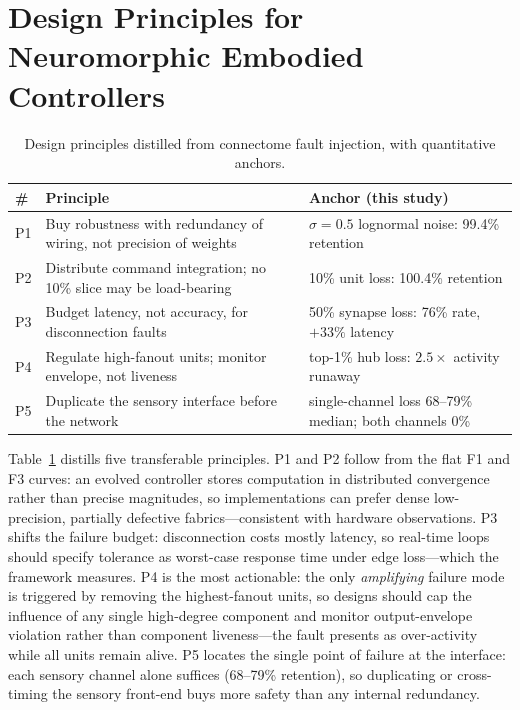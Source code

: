 \section{Design Principles for Neuromorphic Embodied Controllers}
\begin{table}[tb]
\centering
\caption{Design principles distilled from connectome fault injection, with quantitative anchors.}
\label{tab:principles}
\begin{tabular}{@{}p{0.6cm}p{3.4cm}p{3.4cm}@{}}
\toprule
\# & Principle & Anchor (this study) \\
\midrule
P1 & Buy robustness with redundancy of wiring, not precision of weights & $\sigma{=}0.5$ lognormal noise: 99.4\% retention \\
P2 & Distribute command integration; no 10\% slice may be load-bearing & 10\% unit loss: 100.4\% retention \\
P3 & Budget latency, not accuracy, for disconnection faults & 50\% synapse loss: 76\% rate, $+33\%$ latency \\
P4 & Regulate high-fanout units; monitor envelope, not liveness & top-1\% hub loss: $2.5\times$ activity runaway \\
P5 & Duplicate the sensory interface before the network & single-channel loss 68--79\% median; both channels 0\% \\
\bottomrule
\end{tabular}
\end{table}

Table~\ref{tab:principles} distills five transferable principles. P1 and P2 follow from the flat F1 and F3 curves: an evolved controller stores computation in distributed convergence rather than precise magnitudes, so implementations can prefer dense low-precision, partially defective fabrics---consistent with hardware observations\cite{arfa2025hardwareaware,thieu2022effects}. P3 shifts the failure budget: disconnection costs mostly latency, so real-time loops should specify tolerance as worst-case response time under edge loss---which the framework measures. P4 is the most actionable: the only \emph{amplifying} failure mode is triggered by removing the highest-fanout units, so designs should cap the influence of any single high-degree component and monitor output-envelope violation rather than component liveness---the fault presents as over-activity while all units remain alive. P5 locates the single point of failure at the interface: each sensory channel alone suffices (68--79\% retention), so duplicating or cross-timing the sensory front-end buys more safety than any internal redundancy.

